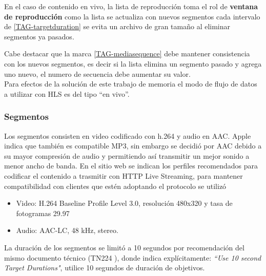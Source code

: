 En el caso de contenido en vivo, la lista de reproducción toma el rol de \textbf{ventana de reproducción}  como la lista se actualiza con nuevos segmentos cada intervalo de \ref{TAG-targetduration} se evita un archivo de gran tamaño al eliminar segmentos ya pasados.

Cabe destacar que la marca \ref{TAG-mediasequence} debe mantener consistencia con los nuevos segmentos, es decir si la lista elimina un segmento pasado y agrega uno nuevo, el numero de secuencia debe aumentar su valor.\\

Para efectos de la solución de este trabajo de memoria el modo de flujo de datos a utilizar con HLS es del tipo ``en vivo''.
\subsubsection{Segmentos}
Los segmentos consisten en video codificado con h.264 y audio en AAC. Apple indica que también es compatible MP3, sin embargo se decidió por AAC debido a su mayor compresión de audio y permitiendo así transmitir un mejor sonido a menor ancho de banda. En el sitio web \cite{apple-hlsencoding} se indican los perfiles recomendados para codificar el contenido a trasmitir con HTTP Live Streaming, para mantener compatibilidad con clientes que estén adoptando el protocolo se utilizó  
\begin{itemize}
\item Video: H.264 Baseline Profile Level 3.0, resolución 480x320 y tasa de fotogramas 29.97

\item Audio: AAC-LC, 48 kHz, stereo.

\end{itemize}

La duración de los segmentos se limitó a 10 segundos por recomendación del mismo documento técnico (TN224 \cite{apple-hlsencoding}), donde indica explícitamente: \textit{\textquotedblleft Use 10 second Target Durations"}, utilice 10 segundos de duración de objetivos.

